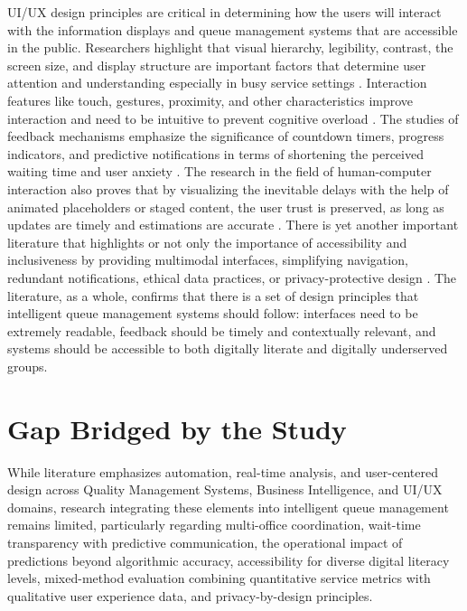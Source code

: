 \documentclass{research}
\begin{document}
UI/UX design principles are critical in determining how the users will interact with the information displays and queue management systems that are accessible in the public. Researchers highlight that visual hierarchy, legibility, contrast, the screen size, and display structure are important factors that determine user attention and understanding especially in busy service settings  \cite{ref20}. Interaction features like touch, gestures, proximity, and other characteristics improve interaction and need to be intuitive to prevent cognitive overload \cite{ref70} \cite{ref72}. The studies of feedback mechanisms emphasize the significance of countdown timers, progress indicators, and predictive notifications in terms of shortening the perceived waiting time and user anxiety \cite{ref78} \cite{ref71}. The research in the field of human-computer interaction also proves that by visualizing the inevitable delays with the help of animated placeholders or staged content, the user trust is preserved, as long as updates are timely and estimations are accurate \cite{ref80} \cite{ref24} \cite{ref79}. There is yet another important literature that highlights or not only the importance of accessibility and inclusiveness by providing multimodal interfaces, simplifying navigation, redundant notifications, ethical data practices, or privacy-protective design \cite{ref20} \cite{ref21} \cite{ref57}. The literature, as a whole, confirms that there is a set of design principles that intelligent queue management systems should follow: interfaces need to be extremely readable, feedback should be timely and contextually relevant, and systems should be accessible to both digitally literate and digitally underserved groups.

\section{Gap Bridged by the Study}
While literature emphasizes automation, real-time analysis, and user-centered design across Quality Management Systems, Business Intelligence, and UI/UX domains, research integrating these elements into intelligent queue management remains limited, particularly regarding multi-office coordination, wait-time transparency with predictive communication, the operational impact of predictions beyond algorithmic accuracy, accessibility for diverse digital literacy levels, mixed-method evaluation combining quantitative service metrics with qualitative user experience data, and privacy-by-design principles.
\end{document}
